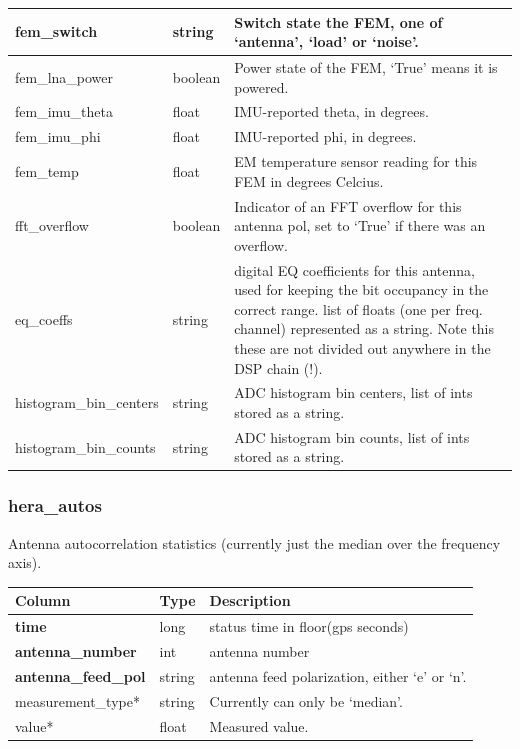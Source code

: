 \documentclass{article}
\begin{document}
{\begin{center}
\begin{tabular}{| p{4cm} | p{2cm} | p{10cm} |}
fem\_switch & string & Switch state the FEM, one of `antenna', `load' or `noise'. \\ \hline
fem\_lna\_power & boolean & Power state of the FEM, `True' means it is powered. \\ \hline
fem\_imu\_theta & float & IMU-reported theta, in degrees. \\ \hline
fem\_imu\_phi & float & IMU-reported phi, in degrees. \\ \hline
fem\_temp & float & EM temperature sensor reading for this FEM in degrees Celcius. \\ \hline
fft\_overflow & boolean & Indicator of an FFT overflow for this antenna pol, set to `True' if there was an overflow. \\ \hline
eq\_coeffs & string & digital EQ coefficients for this antenna, used for keeping the bit occupancy in the
            correct range. list of floats (one per freq. channel) represented as a string. Note this these are
            not divided out anywhere in the DSP chain (!). \\\hline
histogram\_bin\_centers & string & ADC histogram bin centers, list of ints stored as a string. \\ \hline
histogram\_bin\_counts & string & ADC histogram bin counts, list of ints stored as a string. \\ \hline
\end{tabular}
\end{center}

\subsubsection{hera\_autos}
Antenna autocorrelation statistics (currently just the median over the frequency axis).
\begin{center}
\begin{tabular}{| p{4cm} | p{2cm} | p{10cm} |}
\hline
 {\bf Column} & {\bf Type}  & {\bf Description} \\ [0.5ex]  \hline\hline
\textbf{time} & long & status time in floor(gps seconds)\\ \hline
\textbf{antenna\_number} & int & antenna number \\ \hline
\textbf{antenna\_feed\_pol} & string & antenna feed polarization, either `e' or `n'. \\ \hline
measurement\_type* & string & Currently can only be `median'. \\ \hline
value* & float & Measured value. \\ \hline
\end{tabular}
\end{center}


}
\end{document}
